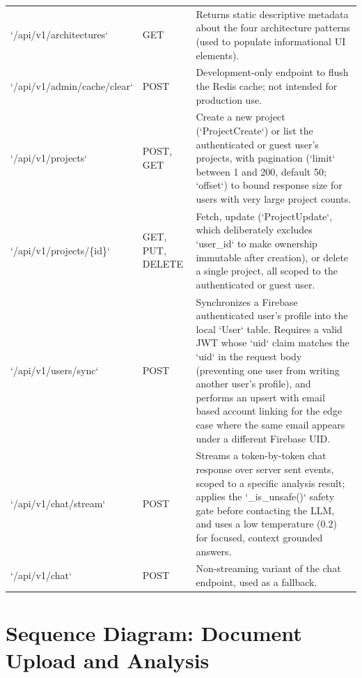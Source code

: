 \documentclass[11pt,a4paper]{report}
\begin{document}
\begin{longtable}{p{2.6cm}p{1.1cm}p{8.6cm}}
`/api/v1/architectures` & GET & Returns static descriptive metadata about the four architecture patterns (used to populate informational UI elements). \\
`/api/v1/admin/cache/clear` & POST & Development-only endpoint to flush the Redis cache; not intended for production use. \\
`/api/v1/projects` & POST, GET & Create a new project (`ProjectCreate`) or list the authenticated or guest user's projects, with pagination (`limit` between 1 and 200, default 50; `offset`) to bound response size for users with very large project counts. \\
`/api/v1/projects/\{id\}` & GET, PUT, DELETE & Fetch, update (`ProjectUpdate`, which deliberately excludes `user_id` to make ownership immutable after creation), or delete a single project, all scoped to the authenticated or guest user. \\
`/api/v1/users/sync` & POST & Synchronizes a Firebase authenticated user's profile into the local `User` table. Requires a valid JWT whose `uid` claim matches the `uid` in the request body (preventing one user from writing another user's profile), and performs an upsert with email based account linking for the edge case where the same email appears under a different Firebase UID. \\
`/api/v1/chat/stream` & POST & Streams a token-by-token chat response over server sent events, scoped to a specific analysis result; applies the `_is_unsafe()` safety gate before contacting the LLM, and uses a low temperature (0.2) for focused, context grounded answers. \\
`/api/v1/chat` & POST & Non-streaming variant of the chat endpoint, used as a fallback. \\
\bottomrule
\end{longtable}

\section{Sequence Diagram: Document Upload and Analysis}
\end{document}
